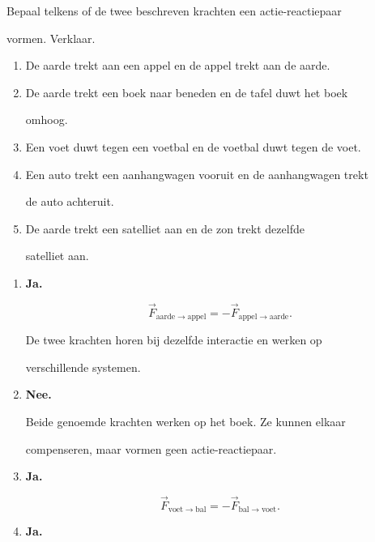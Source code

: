 \documentclass{ximera}
\begin{document}
\begin{oefening}{\oefB\ESS}

Bepaal telkens of de twee beschreven krachten een actie-reactiepaar

vormen. Verklaar.

\begin{enumerate}

 \item De aarde trekt aan een appel en de appel trekt aan de aarde.

 \item De aarde trekt een boek naar beneden en de tafel duwt het boek

    omhoog.

 \item Een voet duwt tegen een voetbal en de voetbal duwt tegen de voet.

 \item Een auto trekt een aanhangwagen vooruit en de aanhangwagen trekt

    de auto achteruit.

 \item De aarde trekt een satelliet aan en de zon trekt dezelfde

    satelliet aan.

\end{enumerate}


\begin{oplossing}

\begin{enumerate}

  \item \textbf{Ja.}

  \[\vec F_{\mathrm{aarde}\rightarrow\mathrm{appel}} = -\vec F_{\mathrm{appel}\rightarrow\mathrm{aarde}}.\]

  De twee krachten horen bij dezelfde interactie en werken op

  verschillende systemen.

  \item \textbf{Nee.}

  Beide genoemde krachten werken op het boek. Ze kunnen elkaar

  compenseren, maar vormen geen actie-reactiepaar.

  \item \textbf{Ja.}

  \[\vec F_{\mathrm{voet}\rightarrow\mathrm{bal}} = -\vec F_{\mathrm{bal}\rightarrow\mathrm{voet}}.\]

  \item \textbf{Ja.}


\end{enumerate}
\end{oplossing}
\end{oefening}
\end{document}
